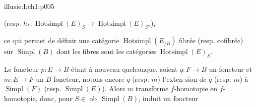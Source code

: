 \begin{illusiebodypage}{illusie:I:ch1:p005}
\hypertarget{illusie:I:ch1:s1:1:eq7}{}%
\noindent{}\par
\noindent\hfill (resp. $h_*:\operatorname{Hotsimpl}(E)_S\longrightarrow
\operatorname{Hotsimpl}(E)_{S''}$),\hfill\mbox{}\par

\hypertarget{illusie:I:ch1:s1:1:p18}{}%
ce qui permet de définir une catégorie $\operatorname{Hotsimpl}(E_{/B})$
fibrée (resp. cofibrée) sur $\operatorname{Simpl}(B)$ dont les fibres sont les
catégories $\operatorname{Hotsimpl}(E)_S$.

\hypertarget{illusie:I:ch1:s1:1:p19}{}%
Le foncteur $p:E\longrightarrow B$ étant à nouveau quelconque, soient
$q:F\longrightarrow B$ un foncteur et $m:E\longrightarrow F$ un $B$-foncteur,
notons encore $q$ (resp. $m$) l'exten-\linebreak sion de $q$ (resp. $m$) à
$\operatorname{Simpl}(F)$ (resp. $\operatorname{Simpl}(E)$). Alors $m$
transforme $f$-homotopie en $f$-homotopie, donc, pour
$S\in\operatorname{ob}\,\operatorname{Simpl}(B)$, induit un foncteur
\end{illusiebodypage}
